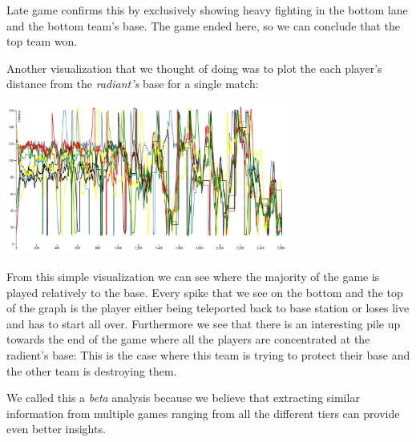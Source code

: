 Late game confirms this by exclusively showing heavy fighting in the bottom lane and the bottom team's base. The game ended here, so we can conclude that the top team won.


Another visualization that we thought of doing was to plot the each player's distance from the \textit{radiant's} base for a single match:

\includegraphics[width=0.7\textwidth]{distance}

From this simple visualization we can see where the majority of the game is played relatively to the base. Every spike that we see on the bottom and the top of the graph is the player either being teleported back to base station or loses live and has to start all over. Furthermore we see that there is an interesting pile up towards the end of the game where all the players are concentrated at the radient's base: This is the case where this team is trying to protect their base and the other team is destroying them.

We called this a \textit{beta} analysis because we believe that extracting similar information from multiple games ranging from all the different tiers can provide even better insights.

